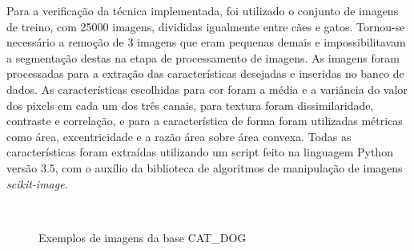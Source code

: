 Para a verificação da técnica implementada, foi utilizado o conjunto de imagens de treino, com 25000 imagens, divididas igualmente entre cães e gatos. 
Tornou-se necessário a remoção de 3 imagens que eram pequenas demais e impossibilitavam a segmentação destas na etapa de processamento de imagens. As imagens foram processadas para a extração
das características desejadas e inseridas no banco de dados. As características escolhidas para cor foram a média e a variância do valor dos pixels em cada um dos três canais, para textura
foram dissimilaridade, contraste e correlação, e para a característica de forma foram utilizadas métricas como área, excentricidade e a razão área sobre área convexa. Todas as características
foram extraídas utilizando um script feito na linguagem Python versão 3.5, com o auxílio da biblioteca de algoritmos de manipulação de imagens \textit{scikit-image}.
\begin{figure}[H]
  \centering
   \hspace{2cm}
   \\
  \hspace{2cm}
  \caption{Exemplos de imagens da base CAT\_DOG}
\label{fig:catdogex}
\end{figure}

